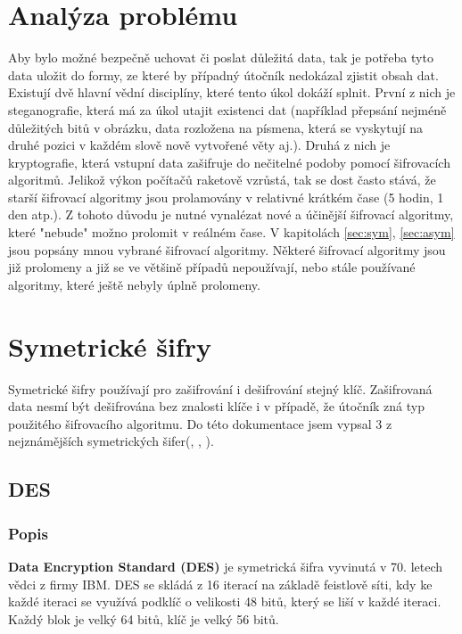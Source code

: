 \documentclass[12pt, a4paper]{article}
\begin{document}
\section{Analýza problému}
Aby bylo možné bezpečně uchovat či poslat důležitá data, tak je potřeba tyto data uložit do formy, ze které by případný útočník nedokázal zjistit obsah dat. Existují dvě hlavní vědní disciplíny, které tento úkol dokáží splnit. První z nich je steganografie, která má za úkol utajit existenci dat (například přepsání nejméně důležitých bitů v obrázku, data rozložena na písmena, která se vyskytují na druhé pozici v každém slově nově vytvořené věty aj.). Druhá z nich je kryptografie, která vstupní data zašifruje do nečitelné podoby pomocí šifrovacích algoritmů. Jelikož výkon počítačů raketově vzrůstá, tak se dost často stává, že starší šifrovací algoritmy jsou prolamovány v relativné krátkém čase (5 hodin, 1 den atp.). Z tohoto důvodu je nutné vynalézat nové a účinější šifrovací algoritmy, které "nebude" možno prolomit v reálném čase. V kapitolách \ref{sec:sym}, \ref{sec:asym} jsou popsány mnou vybrané šifrovací algoritmy. Některé šifrovací algoritmy jsou již prolomeny a již se ve většině případů nepoužívají, nebo stále používané algoritmy, které ještě nebyly úplně prolomeny.

\section{Symetrické šifry}
Symetrické šifry používají pro zašifrování i dešifrování stejný klíč. Zašifrovaná data nesmí být dešifrována bez znalosti klíče i v případě, že útočník zná typ použitého šifrovacího algoritmu. Do této dokumentace jsem vypsal 3 z nejznámějších symetrických šifer(, , ).  
\label{sec:sym}
	\subsection{DES}
	\label{subsec:des}
		\subsubsection{Popis}
		\textbf{Data Encryption Standard (DES)} je symetrická šifra vyvinutá v 70. letech vědci z firmy IBM. DES se skládá z 16 iterací na základě feistlově síti, kdy ke každé iteraci se využívá podklíč o velikosti 48 bitů, který se liší v každé iteraci. Každý blok je velký 64 bitů, klíč je velký 56 bitů.
\end{document}

